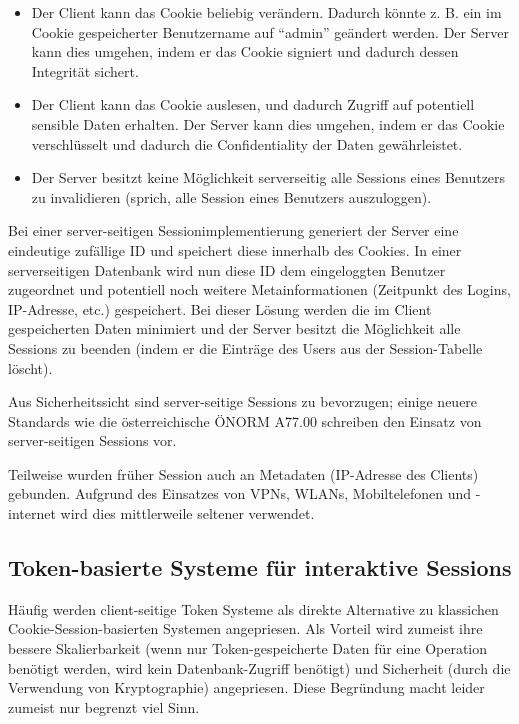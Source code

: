 \begin{itemize}
		\item Der Client kann das Cookie beliebig verändern. Dadurch könnte z. B. ein im Cookie gespeicherter Benutzername auf ``admin'' geändert werden. Der Server kann dies umgehen, indem er das Cookie signiert und dadurch dessen Integrität sichert.
	\item Der Client kann das Cookie auslesen, und dadurch Zugriff auf potentiell sensible Daten erhalten. Der Server kann dies umgehen, indem er das Cookie verschlüsselt und dadurch die Confidentiality der Daten gewährleistet.
	\item Der Server besitzt keine Möglichkeit serverseitig alle Sessions eines Benutzers zu invalidieren (sprich, alle Session eines Benutzers auszuloggen).
\end{itemize}

Bei einer server-seitigen Sessionimplementierung generiert der Server eine eindeutige zufällige ID und speichert diese innerhalb des Cookies. In einer serverseitigen Datenbank wird nun diese ID dem eingeloggten Benutzer zugeordnet und potentiell noch weitere Metainformationen (Zeitpunkt des Logins, IP-Adresse, etc.) gespeichert. Bei dieser Lösung werden die im Client gespeicherten Daten minimiert und der Server besitzt die Möglichkeit alle Sessions zu beenden (indem er die Einträge des Users aus der Session-Tabelle löscht).

Aus Sicherheitssicht sind server-seitige Sessions zu bevorzugen; einige neuere Standards wie die österreichische ÖNORM A77.00 schreiben den Einsatz von server-seitigen Sessions vor.

Teilweise wurden früher Session auch an Metadaten (IP-Adresse des Clients) gebunden. Aufgrund des Einsatzes von VPNs, WLANs, Mobiltelefonen und -internet wird dies mittlerweile seltener verwendet.


\subsection{Token-basierte Systeme für interaktive Sessions}

Häufig werden client-seitige Token Systeme als direkte Alternative zu klassichen Cookie-Session-basierten Systemen angepriesen. Als Vorteil wird zumeist ihre bessere Skalierbarkeit (wenn nur Token-gespeicherte Daten für eine Operation benötigt werden, wird kein Datenbank-Zugriff benötigt) und Sicherheit (durch die Verwendung von Kryptographie) angepriesen. Diese Begründung macht leider zumeist nur begrenzt viel Sinn.

